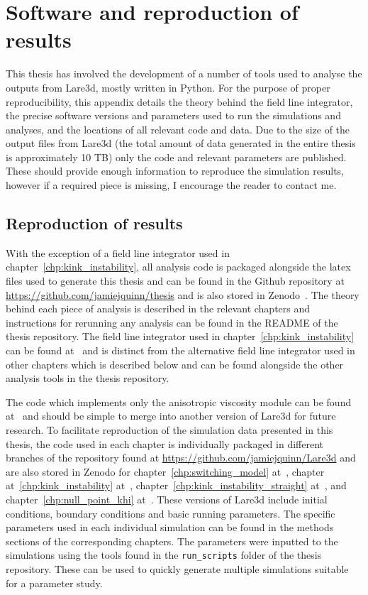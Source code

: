 \chapter{Software and reproduction of results}

This thesis has involved the development of a number of tools used to analyse the outputs from Lare3d, mostly written in Python. For the purpose of proper reproducibility, this appendix details the theory behind the field line integrator, the precise software versions and parameters used to run the simulations and analyses, and the locations of all relevant code and data. Due to the size of the output files from Lare3d (the total amount of data generated in the entire thesis is approximately 10 TB) only the code and relevant parameters are published. These should provide enough information to reproduce the simulation results, however if a required piece is missing, I encourage the reader to contact me.

\section{Reproduction of results}

With the exception of a field line integrator used in chapter~\ref{chp:kink_instability}, all analysis code is packaged alongside the latex files used to generate this thesis and can be found in the Github repository at \url{https://github.com/jamiejquinn/thesis} and is also stored in Zenodo~\cite{jamie_j_quinn_2020_4263146}. The theory behind each piece of analysis is described in the relevant chapters and instructions for rerunning any analysis can be found in the README of the thesis repository. The field line integrator used in chapter~\ref{chp:kink_instability} can be found at~\cite{jamie_j_quinn_2019_3560249} and is distinct from the alternative field line integrator used in other chapters which is described below and can be found alongside the other analysis tools in the thesis repository.

The code which implements only the anisotropic viscosity module can be found at~\cite{keith_bennett_2020_4155546} and should be simple to merge into another version of Lare3d for future research. To facilitate reproduction of the simulation data presented in this thesis, the code used in each chapter is individually packaged in different branches of the repository found at \url{https://github.com/jamiejquinn/Lare3d} and are also stored in Zenodo for chapter~\ref{chp:switching_model} at~\cite{keith_bennett_2020_4155661}, chapter at~\ref{chp:kink_instability} at~\cite{keith_bennett_2020_4155670}, chapter~\ref{chp:kink_instability_straight} at~\cite{keith_bennett_2020_4155625}, and chapter~\ref{chp:null_point_khi} at~\cite{keith_bennett_2020_4155646}. These versions of Lare3d include initial conditions, boundary conditions and basic running parameters. The specific parameters used in each individual simulation can be found in the methods sections of the corresponding chapters. The parameters were inputted to the simulations using the tools found in the \verb|run_scripts| folder of the thesis repository. These can be used to quickly generate multiple simulations suitable for a parameter study.

